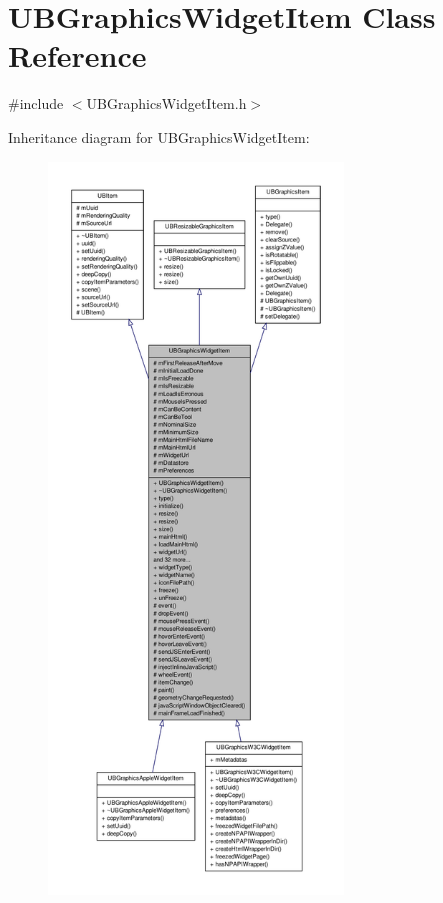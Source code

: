 \hypertarget{class_u_b_graphics_widget_item}{\section{U\-B\-Graphics\-Widget\-Item Class Reference}
\label{d0/d16/class_u_b_graphics_widget_item}
}


{\ttfamily \#include $<$U\-B\-Graphics\-Widget\-Item.\-h$>$}



Inheritance diagram for U\-B\-Graphics\-Widget\-Item\-:
\nopagebreak
\begin{figure}[H]
\begin{center}
\leavevmode
\includegraphics[height=550pt]{d0/dd4/class_u_b_graphics_widget_item__inherit__graph}
\end{center}
\end{figure}


